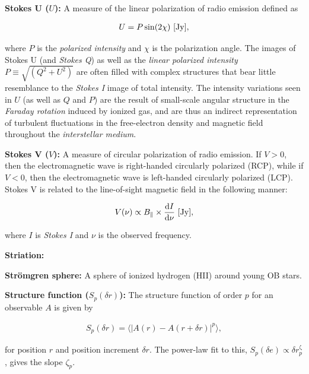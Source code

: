 \documentclass[a4paper,10pt]{article}
\begin{document}
{\noindent}\textbf{Stokes U ($U$):} A measure of the linear polarization of radio emission defined as

\begin{align*}
    U = P\sin(2\chi) ~ [{\rm Jy}],
\end{align*}

{\noindent}where $P$ is the \textit{polarized intensity} and $\chi$ is the polarization angle. The images of Stokes U (and \textit{Stokes Q}) as well as the \textit{linear polarized intensity} $P\equiv\sqrt{(Q^2+U^2)}$ are often filled with complex structures that bear little resemblance to the \textit{Stokes I} image of total intensity. The intensity variations seen in $U$ (as well as $Q$ and $P$) are the result of small-scale angular structure in the \textit{Faraday rotation} induced by ionized gas, and are thus an indirect representation of turbulent fluctuations in the free-electron density and magnetic field throughout the \textit{interstellar medium}.

{\noindent}\textbf{Stokes V ($V$):} A measure of circular polarization of radio emission. If $V>0$, then the electromagnetic wave is right-handed circularly polarized (RCP), while if $V<0$, then the electromagnetic wave is left-handed circularly polarized (LCP). Stokes V is related to the line-of-sight magnetic field in the following manner:

\begin{align*}
    V(\nu) \propto B_\parallel \times \frac{\mathrm{d}I}{\mathrm{d}\nu} ~ [{\rm Jy}],
\end{align*}

{\noindent}where $I$ is \textit{Stokes I} and $\nu$ is the observed frequency.

{\noindent}\textbf{Striation:} 

{\noindent}\textbf{Str\"{o}mgren sphere:} A sphere of ionized hydrogen (HII) around young OB stars.

{\noindent}\textbf{Structure function ($S_p(\delta r)$):} The structure function of order $p$ for an observable $A$ is given by

\begin{align*}
    S_p(\delta r) = \langle\lvert A(r)-A(r+\delta r)\rvert^p\rangle,
\end{align*}

{\noindent}for position $r$ and position increment $\delta r$. The power-law fit to this, $S_p(\delta e)\propto\delta r^{\upzeta}_p$, gives the slope $\zeta_p$.
\end{document}
